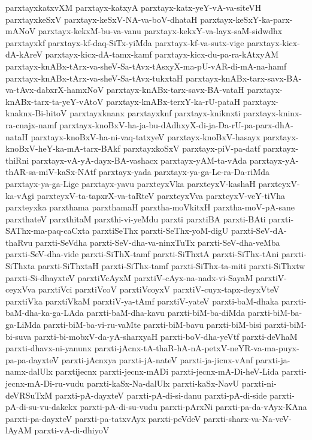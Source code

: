 {parxtayxkatxvXM
parxtayx-katxyA
parxtayx-katx-yeY-vA-va-siteVH
parxtayxkeSxV
parxtayx-keSxV-NA-va-boV-dhataH
parxtayx-keSxY-ka-parx-mANoV
parxtayx-kekxM-bu-va-vanu
parxtayx-kekxY-va-layx-saM-sidwdhx
parxtayxkf
parxtayx-kf-daq-SiTx-yiMda
parxtayx-kf-va-sutx-vige
parxtayx-kicx-dA-kAreV
parxtayx-kicx-dA-tamx-kamf
parxtayx-kicx-du-pa-ra-kAtxyAM
parxtayx-knABx-tArx-va-sheV-Sa-tAvx-tAsxyX-ma-pU-vAR-di-mA-na-hamf
parxtayx-knABx-tArx-va-sheV-Sa-tAvx-tukxtaH
parxtayx-knABx-tarx-savx-BA-va-tAvx-dabxrX-hamxNoV
parxtayx-knABx-tarx-savx-BA-vataH
parxtayx-knABx-tarx-ta-yeY-vAtoV
parxtayx-knABx-terxY-ka-rU-pataH
parxtayx-knaknx-Bi-hitoV
parxtayxknanx
parxtayxknf
parxtayx-kniknxti
parxtayx-kninx-ra-cnajx-namf
parxtayx-knoBxV-ha-ja-bu-dAdhxyX-di-ja-Da-rU-pa-parx-dhA-nataH
parxtayx-knoBxV-ha-ni-vaq-tatxyeV
parxtayx-knoBxV-hasayx
parxtayx-knoBxV-heY-ka-mA-tarx-BAkf
parxtayxkoSxV
parxtayx-piV-pa-datf
parxtayx-thiRni
parxtayx-vA-yA-dayx-BA-vashacx
parxtayx-yAM-ta-vAda
parxtayx-yA-thAR-sa-miV-kaSx-NAtf
parxtayx-yada
parxtayx-ya-ga-Le-ra-Da-riMda
parxtayx-ya-ga-Lige
parxtayx-yavu
parxteyxVka
parxteyxV-kashaH
parxteyxV-ka-vAgi
parxteyxV-ta-tapxrX-va-taRteV
parxteyxVva
parxteyxV-veY-tiVha
parxteyxka
parxthama
parxthamaH
parxtha-moVkitxH
parxtha-moV-pA-sane
parxthateV
parxthitaM
parxthi-vi-yeMdu
parxti
parxtiBA
parxti-BAti
parxti-SAThx-ma-paq-caCxta
parxtiSeThx
parxti-SeThx-yoM-digU
parxti-SeV-dA-thaRvu
parxti-SeVdha
parxti-SeV-dha-va-ninxTuTx
parxti-SeV-dha-veMba
parxti-SeV-dha-vide
parxti-SiThX-tamf
parxti-SiThxtA
parxti-SiThx-tAni
parxti-SiThxta
parxti-SiThxtaH
parxti-SiThx-tamf
parxti-SiThx-ta-miti
parxti-SiThxtw
parxti-Si-dhayxteV
parxtiVcAyxM
parxtiV-cAyx-na-nadx-vi-SayaM
parxtiV-ceyxVva
parxtiVci
parxtiVcoV
parxtiVcoyxV
parxtiV-cuyx-tapx-deyxVteV
parxtiVka
parxtiVkaM
parxtiV-ya-tAmf
parxtiV-yateV
parxti-baM-dhaka
parxti-baM-dha-ka-ga-LAda
parxti-baM-dha-kavu
parxti-biM-ba-diMda
parxti-biM-ba-ga-LiMda
parxti-biM-ba-vi-ru-vaMte
parxti-biM-bavu
parxti-biM-bisi
parxti-biM-bi-suva
parxti-bi-mobxV-da-yA-sharxyaH
parxti-boV-dha-yeVtf
parxti-deVhaM
parxti-dhavx-ni-yanunx
parxti-jAcnx-tA-thaR-hA-nA-petxV-neYR-va-ma-puyx-pa-pa-dayxteV
parxti-jAcnxya
parxti-jA-nateV
parxti-ja-jicnx-vAnf
parxti-ja-namx-dalUlx
parxtijecnx
parxti-jecnx-mADi
parxti-jecnx-mA-Di-heV-Lida
parxti-jecnx-mA-Di-ru-vudu
parxti-kaSx-Na-dalUlx
parxti-kaSx-NavU
parxti-ni-deVRSuTxM
parxti-pA-dayxteV
parxti-pA-di-si-danu
parxti-pA-di-side
parxti-pA-di-su-vu-dakekx
parxti-pA-di-su-vudu
parxti-pArxNi
parxti-pa-da-vAyx-KAna
parxti-pa-dayxteV
parxti-pa-tatxvAyx
parxti-peVdeV
parxti-sharx-va-Na-veV-lAyAM
parxti-vA-di-dhiyoV
}
